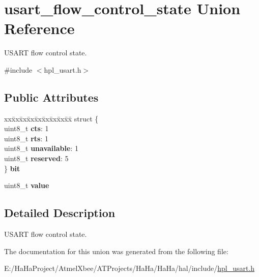 \hypertarget{unionusart__flow__control__state}{}\section{usart\+\_\+flow\+\_\+control\+\_\+state Union Reference}
\label{unionusart__flow__control__state}


U\+S\+A\+RT flow control state.  




{\ttfamily \#include $<$hpl\+\_\+usart.\+h$>$}

\subsection*{Public Attributes}
\begin{DoxyCompactItemize}
\item 
\mbox{\label{unionusart__flow__control__state_a6ade7bab5cb48566816f4e6d6c429839}} 
\begin{tabbing}
xx\=xx\=xx\=xx\=xx\=xx\=xx\=xx\=xx\=\kill
struct \{\\
\>uint8\_t {\bfseries cts}: 1\\
\>uint8\_t {\bfseries rts}: 1\\
\>uint8\_t {\bfseries unavailable}: 1\\
\>uint8\_t {\bfseries reserved}: 5\\
\} {\bfseries bit}\\

\end{tabbing}\item 
\mbox{\label{unionusart__flow__control__state_a89fd17179ea28972111f4e5822de3e4e}} 
uint8\+\_\+t {\bfseries value}
\end{DoxyCompactItemize}


\subsection{Detailed Description}
U\+S\+A\+RT flow control state. 

The documentation for this union was generated from the following file\+:\begin{DoxyCompactItemize}
\item 
E\+:/\+Ha\+Ha\+Project/\+Atmel\+Xbee/\+A\+T\+Projects/\+Ha\+Ha/\+Ha\+Ha/hal/include/\hyperlink{hpl__usart_8h}{hpl\+\_\+usart.\+h}\end{DoxyCompactItemize}
